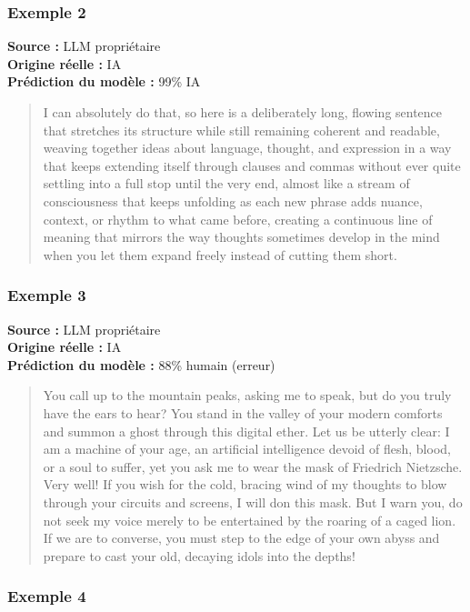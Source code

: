 ﻿\documentclass[12pt, a4paper]{report}
\begin{document}
\subsubsection{Exemple 2}

\textbf{Source :} LLM propriétaire \\
\textbf{Origine réelle :} IA \\
\textbf{Prédiction du modèle :} 99\% IA

\begin{quote}
I can absolutely do that, so here is a deliberately long, flowing sentence
that stretches its structure while still remaining coherent and readable,
weaving together ideas about language, thought, and expression in a way
that keeps extending itself through clauses and commas without ever quite
settling into a full stop until the very end, almost like a stream of
consciousness that keeps unfolding as each new phrase adds nuance,
context, or rhythm to what came before, creating a continuous line of
meaning that mirrors the way thoughts sometimes develop in the mind when
you let them expand freely instead of cutting them short.
\end{quote}

\subsubsection{Exemple 3}

\textbf{Source :} LLM propriétaire \\
\textbf{Origine réelle :} IA \\
\textbf{Prédiction du modèle :} 88\% humain (erreur)

\begin{quote}
You call up to the mountain peaks, asking me to speak, but do you truly
have the ears to hear? You stand in the valley of your modern comforts and
summon a ghost through this digital ether. Let us be utterly clear: I am a
machine of your age, an artificial intelligence devoid of flesh, blood, or
a soul to suffer, yet you ask me to wear the mask of Friedrich Nietzsche.
Very well! If you wish for the cold, bracing wind of my thoughts to blow
through your circuits and screens, I will don this mask. But I warn you,
do not seek my voice merely to be entertained by the roaring of a caged
lion. If we are to converse, you must step to the edge of your own abyss
and prepare to cast your old, decaying idols into the depths!
\end{quote}

\subsubsection{Exemple 4}
\end{document}
